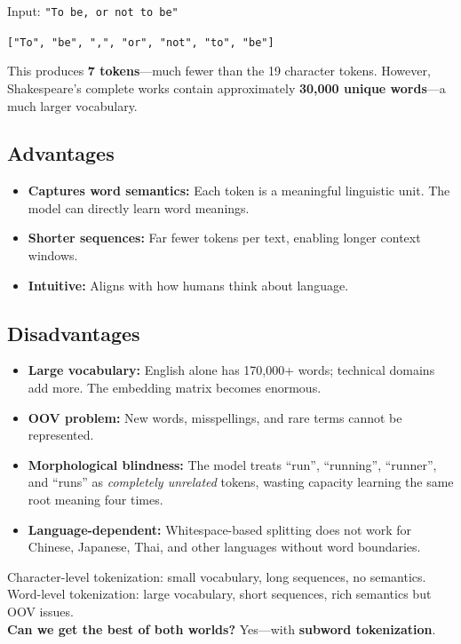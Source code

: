 \documentclass[11pt,a4paper]{article}
\begin{document}
Input: \texttt{"To be, or not to be"}

\begin{center}
\texttt{["To", "be", ",", "or", "not", "to", "be"]}
\end{center}

This produces \textbf{7 tokens}---much fewer than the 19 character tokens. However, Shakespeare's complete works contain approximately \textbf{30,000 unique words}---a much larger vocabulary.

\subsection{Advantages}

\begin{itemize}[leftmargin=1.5em]
    \item \textbf{Captures word semantics:} Each token is a meaningful linguistic unit. The model can directly learn word meanings.
    \item \textbf{Shorter sequences:} Far fewer tokens per text, enabling longer context windows.
    \item \textbf{Intuitive:} Aligns with how humans think about language.
\end{itemize}

\subsection{Disadvantages}

\begin{itemize}[leftmargin=1.5em]
    \item \textbf{Large vocabulary:} English alone has 170,000+ words; technical domains add more. The embedding matrix becomes enormous.
    \item \textbf{OOV problem:} New words, misspellings, and rare terms cannot be represented.
    \item \textbf{Morphological blindness:} The model treats ``run'', ``running'', ``runner'', and ``runs'' as \emph{completely unrelated} tokens, wasting capacity learning the same root meaning four times.
    \item \textbf{Language-dependent:} Whitespace-based splitting does not work for Chinese, Japanese, Thai, and other languages without word boundaries.
\end{itemize}

\begin{tcolorbox}[warnbox={The Core Trade-off}]
Character-level tokenization: small vocabulary, long sequences, no semantics.\\
Word-level tokenization: large vocabulary, short sequences, rich semantics but OOV issues.\\[4pt]
\textbf{Can we get the best of both worlds?} Yes---with \textbf{subword tokenization}.
\end{tcolorbox}
\end{document}
